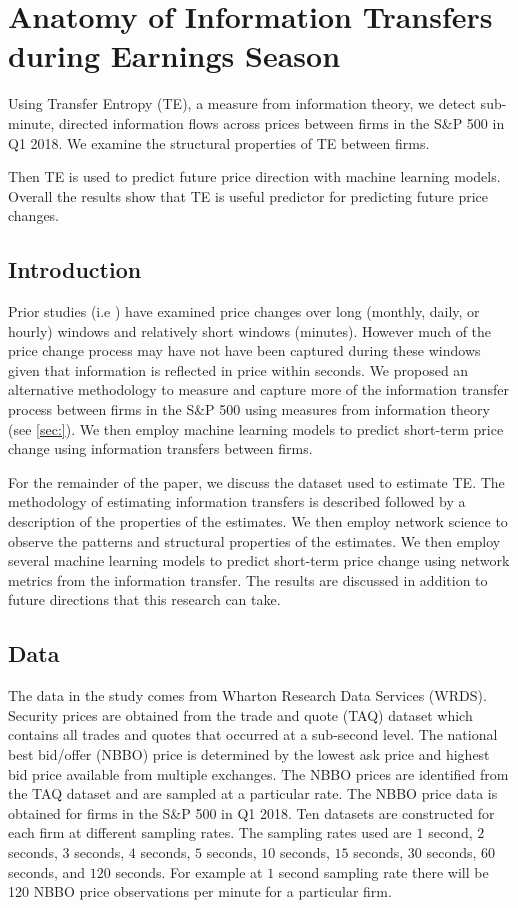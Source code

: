 \chapter{Anatomy of Information Transfers during Earnings Season}

Using Transfer Entropy (TE), a measure from information theory, we detect sub-minute, directed information flows across prices between firms in the S\&P 500 in Q1 2018. We examine the structural properties of TE between firms. 

Then TE is used to predict future price direction with machine learning models. Overall the results show that TE is useful predictor for predicting future price changes. 

\section{Introduction}

Prior studies (i.e \cite{}) have examined price changes over long (monthly, daily, or hourly) windows and relatively short windows (minutes). However much of the price change process may have not have been captured during these windows given that information is reflected in price within seconds. We proposed an alternative methodology to measure and capture more of the information transfer process between firms in the S\&P 500 using measures from information theory (see \ref{sec:}). We then employ machine learning models to predict short-term price change using information transfers between firms.

For the remainder of the paper, we discuss the dataset used to estimate TE. The methodology of estimating information transfers is described followed by a description of the properties of the estimates. We then employ network science to observe the patterns and structural properties of the estimates. We then employ several machine learning models to predict short-term price change using network metrics from the information transfer. The results are discussed in addition to future directions that this research can take.

\section{Data}
\label{sec:Data}

The data in the study comes from Wharton Research Data Services (WRDS).  Security prices are obtained from the trade and quote (TAQ) dataset which contains all trades and quotes that occurred at a sub-second level. The national best bid/offer (NBBO) price is determined by the lowest ask price and highest bid price available from multiple exchanges. The NBBO prices are identified from the TAQ dataset and are sampled at a particular rate.  The NBBO price data is obtained for firms in the S\&P 500 in Q1 2018.  Ten datasets are constructed for each firm at different sampling rates. The sampling rates used are $1$ second, $2$ seconds, $3$ seconds, $4$ seconds, $5$ seconds, $10$ seconds, $15$ seconds, $30$ seconds, $60$ seconds, and $120$ seconds. For example at $1$ second sampling rate there will be 120 NBBO price observations per minute for a particular firm.

